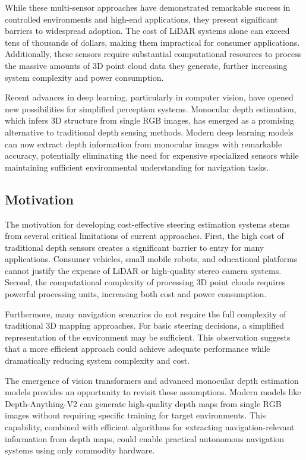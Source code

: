 \documentclass[conference]{IEEEtran}
\begin{document}
While these multi-sensor approaches have demonstrated remarkable success in controlled environments and high-end applications, they present significant barriers to widespread adoption. The cost of LiDAR systems alone can exceed tens of thousands of dollars, making them impractical for consumer applications. Additionally, these sensors require substantial computational resources to process the massive amounts of 3D point cloud data they generate, further increasing system complexity and power consumption.

Recent advances in deep learning, particularly in computer vision, have opened new possibilities for simplified perception systems. Monocular depth estimation, which infers 3D structure from single RGB images, has emerged as a promising alternative to traditional depth sensing methods. Modern deep learning models can now extract depth information from monocular images with remarkable accuracy, potentially eliminating the need for expensive specialized sensors while maintaining sufficient environmental understanding for navigation tasks.

\subsection{Motivation}
The motivation for developing cost-effective steering estimation systems stems from several critical limitations of current approaches. First, the high cost of traditional depth sensors creates a significant barrier to entry for many applications. Consumer vehicles, small mobile robots, and educational platforms cannot justify the expense of LiDAR or high-quality stereo camera systems. Second, the computational complexity of processing 3D point clouds requires powerful processing units, increasing both cost and power consumption.

Furthermore, many navigation scenarios do not require the full complexity of traditional 3D mapping approaches. For basic steering decisions, a simplified representation of the environment may be sufficient. This observation suggests that a more efficient approach could achieve adequate performance while dramatically reducing system complexity and cost.

The emergence of vision transformers and advanced monocular depth estimation models provides an opportunity to revisit these assumptions. Modern models like Depth-Anything-V2 can generate high-quality depth maps from single RGB images without requiring specific training for target environments. This capability, combined with efficient algorithms for extracting navigation-relevant information from depth maps, could enable practical autonomous navigation systems using only commodity hardware.
\end{document}
